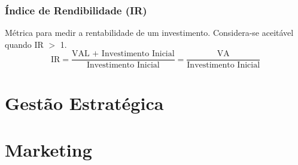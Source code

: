 \documentclass[11pt]{article}
\begin{document}
\subsubsection{Índice de Rendibilidade (IR)}

Métrica para medir a rentabilidade de um investimento. Considera-se aceitável quando IR $>$ 1.
\begin{equation*}
    \text{IR} = \frac{\text{VAL + Investimento Inicial}}{\text{Investimento Inicial}}
    = \frac{\text{VA}}{\text{Investimento Inicial}}
\end{equation*}

\newpage

\section{Gestão Estratégica}

\section{Marketing}
\end{document}
